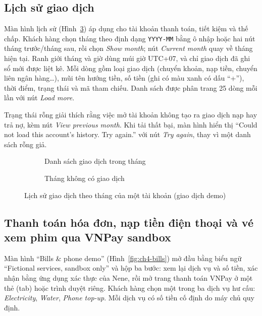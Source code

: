 \subsection{Lịch sử giao dịch}
\label{sec:ch4-history}

Màn hình lịch sử (Hình~\ref{fig:ch4-history}) áp dụng cho tài khoản thanh toán, tiết kiệm và thế chấp. Khách hàng chọn tháng theo định dạng \texttt{YYYY-\allowbreak{}MM} bằng ô nhập hoặc hai nút tháng trước/tháng sau, rồi chọn \textit{Show month}; nút \textit{Current month} quay về tháng hiện tại. Ranh giới tháng và giờ dùng múi giờ UTC+07, và chỉ giao dịch đã ghi sổ mới được liệt kê. Mỗi dòng gồm loại giao dịch (chuyển khoản, nạp tiền, chuyển liên ngân hàng\ldots), mũi tên hướng tiền, số tiền (ghi có màu xanh có dấu ``+''), thời điểm, trạng thái và mã tham chiếu. Danh sách được phân trang 25 dòng mỗi lần với nút \textit{Load more}.

Trạng thái rỗng giải thích rằng việc mở tài khoản không tạo ra giao dịch nạp hay trả nợ, kèm nút \textit{View previous month}. Khi tải thất bại, màn hình hiển thị ``Could not load this account's history. Try again.'' với nút \textit{Try again}, thay vì một danh sách rỗng giả.

\begin{figure}[H]
\centering
\begin{subfigure}[t]{0.4\textwidth}
  \centering
  \caption{Danh sách giao dịch trong tháng}
  \label{fig:ch4-history-list}
\end{subfigure}\hspace{0.05\textwidth}%
\begin{subfigure}[t]{0.4\textwidth}
  \centering
  \caption{Tháng không có giao dịch}
  \label{fig:ch4-history-empty}
\end{subfigure}
\caption{Lịch sử giao dịch theo tháng của một tài khoản (giao dịch demo)}
\label{fig:ch4-history}
\end{figure}

\subsection{Thanh toán hóa đơn, nạp tiền điện thoại và vé xem phim qua VNPay sandbox}
\label{sec:ch4-payments}

Màn hình ``Bills \& phone demo'' (Hình~\ref{fig:ch4-bills}) mở đầu bằng biểu ngữ ``Fictional services, sandbox only'' và hộp ba bước: xem lại dịch vụ và số tiền, xác nhận bằng ứng dụng xác thực của Nene, rồi mở trang thanh toán VNPay ở một thẻ (tab) hoặc trình duyệt riêng. Khách hàng chọn một trong ba dịch vụ hư cấu: \textit{Electricity}, \textit{Water}, \textit{Phone top-up}. Mỗi dịch vụ có số tiền cố định do máy chủ quy định.

